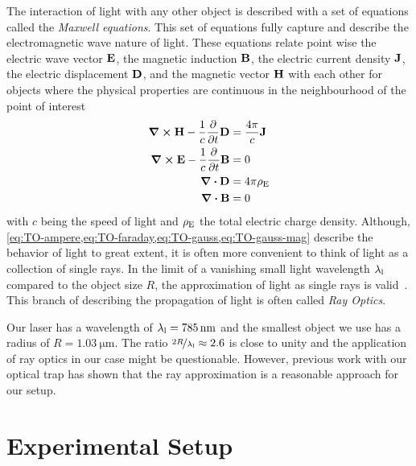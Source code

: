 The interaction of light with any other object is described with a set of 
equations called the \emph{Maxwell equations}. This set of equations fully 
capture and describe the electromagnetic wave nature of light. These equations 
relate point wise the electric wave vector $\vb{E}$, the magnetic induction 
$\vb{B}$, the electric current density $\vb{J}$, the electric displacement 
$\vb{D}$, and the magnetic vector $\vb{H}$ with each other for objects where 
the physical properties are continuous in the neighbourhood of the point of 
interest~\cite{Born1980Ch1}
\begin{subequations}
  \begin{align}
    \curl{\vb{H}} - \frac{1}{c}\pdv{t}\vb{D} &=\frac{4\pi}{c}\vb{J} 
    \label{eq:TO-ampere} \\
    \curl{\vb{E}} - \frac{1}{c}\pdv{t}\vb{B} &=  0
    \label{eq:TO-faraday} \\
    \div{\vb{D}} &= 4\pi\rho_{\mathrm{E}}
    \label{eq:TO-gauss} \\
    \div{\vb{B}} &= 0
    \label{eq:TO-gauss-mag}
  \end{align}
\end{subequations}
with $c$ being the speed of light and $\rho_{\mathrm{E}}$ the total electric charge 
density. Although, 
\cref{eq:TO-ampere,eq:TO-faraday,eq:TO-gauss,eq:TO-gauss-mag} describe the 
behavior of light to great extent, it is often more convenient to think of 
light as a collection of single rays. In the limit of a vanishing small light 
wavelength $\lambda_{\mathrm{l}}$ compared to the object size $R$, the approximation of light 
as single rays is valid~\cite{Born1980Ch3}. This branch of describing the 
propagation of light is often called \emph{Ray Optics}.

Our laser has a wavelength of $\lal=\SI{785}{\nm}$ and the smallest object we 
use has a radius of $R=\SI{1.03}{\um}$. The ratio $\nicefrac{2R}{\lambda_{\mathrm{l}}}\approx 
2.6$ is close to unity and the application of ray optics in our case might be 
questionable. However, previous work with our optical trap
\cite{Lakaemper2015,Lamprecht2016,Lamprecht2017} has shown that the ray 
approximation is a reasonable approach for our setup.

\section{Experimental Setup}

